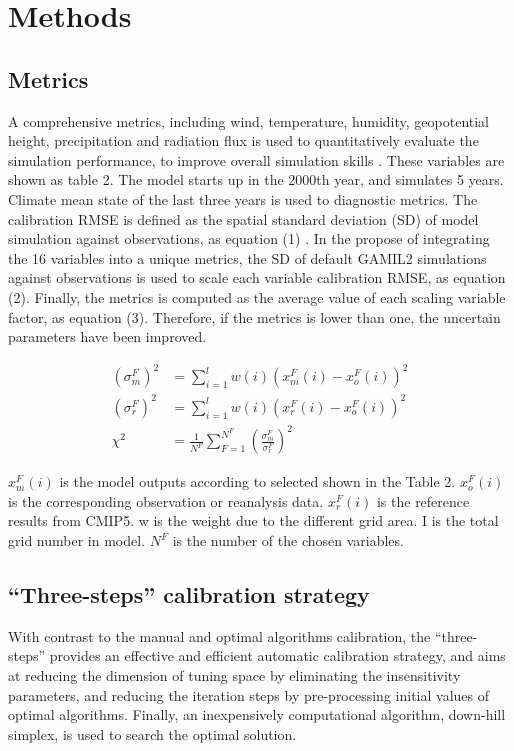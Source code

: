 \documentclass[gmd, manuscript]{copernicus}
\begin{document}
\section{Methods}
\subsection{Metrics}
A comprehensive metrics, including wind, temperature, humidity, geopotential height, precipitation
and radiation flux is used to quantitatively evaluate the simulation performance, to improve
overall simulation skills \citep{murphy2004quantification,gleckler2008performance,reichler2008well}
. These variables are shown as table 2. The model starts up in the 2000th year, and simulates 5
years. Climate mean state of the last three years is used to diagnostic metrics. The
calibration RMSE is defined as the spatial standard deviation (SD) of model simulation against
observations, as equation (1) \citep{taylor2001summarizing,yang2013uncertainty}. In the propose  of
integrating the 16 variables into a unique metrics, the SD of default GAMIL2  simulations against
observations is used to scale each variable calibration RMSE, as equation (2). Finally, the 
metrics is computed as the average value of each scaling variable factor, as equation (3). 
Therefore, if the metrics is lower than one, the uncertain parameters have been improved.

\begin{align}
(\sigma_m^F)^2 &= \sum_{i=1}^l w(i)(x_m^F(i) - x_o^F(i))^2 \\
(\sigma_r^F)^2 &= \sum_{i=1}^l w(i)(x_r^F(i) - x_o^F(i))^2 \\
\chi^2 &= \frac{1}{N^F}\sum_{F=1}^{N^F} (\frac{\sigma_m^F}{\sigma_r^F})^2
\end{align}

$x_m^F(i)$ is the model outputs according to selected shown in the Table 2. $x_o^F(i)$ is the 
corresponding observation or reanalysis data. $x_r^F(i)$ is the reference results from CMIP5. w is 
the weight due to the different grid area. I is the total grid number in model. $N^F$ is the 
number of the chosen variables.

\subsection{``Three-steps'' calibration strategy}
With contrast to the manual and optimal algorithms calibration, the ``three-steps'' provides an
effective and efficient automatic calibration strategy,  and aims at
reducing the dimension of tuning space by eliminating the insensitivity parameters, and reducing
the iteration steps by pre-processing initial values of optimal algorithms. Finally, an
inexpensively computational algorithm, down-hill simplex, is used to search the optimal solution.
\end{document}
